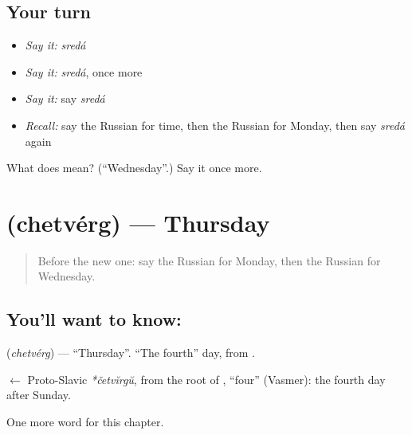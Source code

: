 \subsection*{Your turn}
\begin{itemize}
\raggedright
  \item \emph{Say it:} \emph{sredá}
  \item \emph{Say it:} \emph{sredá}, once more
  \item \emph{Say it:} say \emph{sredá}
  \item \emph{Recall:} say the Russian for time, then the Russian for Monday, then say \emph{sredá} again
\end{itemize}

\begin{tcolorbox}[breakable,colback=teal!4,colframe=teal!35!black,title={Before you move on}]
What does  mean? (\textquotedblleft{}Wednesday\textquotedblright{}.) Say it once more.
\end{tcolorbox}
\section[\texorpdfstring{\ru{четверг} (chetvérg)}{четверг (chetvérg)}]{ (chetvérg) — Thursday}

\label{lesson:RU-C70-thursday}



\begin{quote}
Before the new one: say the Russian for Monday, then the Russian for Wednesday.
\end{quote}

\subsection*{You'll want to know: }
\textbf{} (\emph{chetvérg}) — \textquotedblleft{}Thursday\textquotedblright{}. \textquotedblleft{}The fourth\textquotedblright{} day, from \textbf{}.

\begin{cousinweb}
\textbf{} $\leftarrow$ Proto-Slavic \emph{*četvĭrgŭ}, from the root of \emph{}, \textquotedblleft{}four\textquotedblright{} (Vasmer): the fourth day after Sunday.
\end{cousinweb}

\begin{grammarlens}[title={What you've built}]
One more word for this chapter.
\end{grammarlens}

